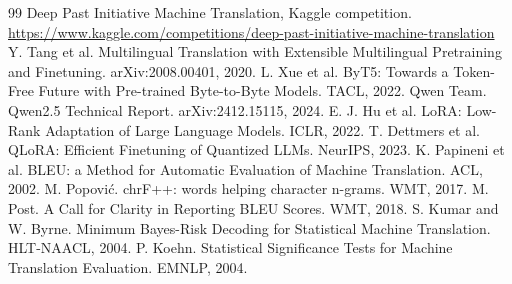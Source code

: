 \documentclass[a4paper,12pt]{article}
\begin{document}
\begin{thebibliography}{99}\small
{} Deep Past Initiative Machine Translation, Kaggle competition. \url{https://www.kaggle.com/competitions/deep-past-initiative-machine-translation}
 Y. Tang et al. Multilingual Translation with Extensible Multilingual Pretraining and Finetuning. arXiv:2008.00401, 2020.
 L. Xue et al. ByT5: Towards a Token-Free Future with Pre-trained Byte-to-Byte Models. TACL, 2022.
 Qwen Team. Qwen2.5 Technical Report. arXiv:2412.15115, 2024.
 E. J. Hu et al. LoRA: Low-Rank Adaptation of Large Language Models. ICLR, 2022.
 T. Dettmers et al. QLoRA: Efficient Finetuning of Quantized LLMs. NeurIPS, 2023.
 K. Papineni et al. BLEU: a Method for Automatic Evaluation of Machine Translation. ACL, 2002.
 M. Popovi\'c. chrF++: words helping character n-grams. WMT, 2017.
 M. Post. A Call for Clarity in Reporting BLEU Scores. WMT, 2018.
 S. Kumar and W. Byrne. Minimum Bayes-Risk Decoding for Statistical Machine Translation. HLT-NAACL, 2004.
 P. Koehn. Statistical Significance Tests for Machine Translation Evaluation. EMNLP, 2004.
\end{thebibliography}
\end{document}
